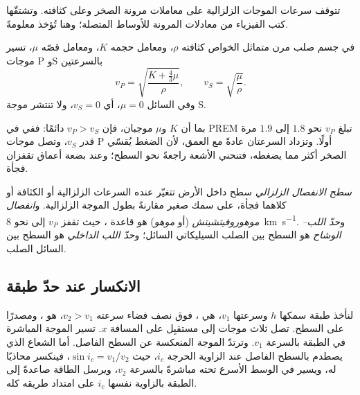 تتوقف سرعات الموجات الزلزالية على معاملات مرونة الصخر وعلى كثافته. وتشتقّها كتب الفيزياء من معادلات المرونة للأوساط المتصلة؛ وهنا تُؤخذ معلومةً.

\begin{proposition}\label{prop:b1:layered-earth:speeds}
في جسم صلب مرن متماثل الخواص كثافته $\rho$، ومعامل حجمه $K$، ومعامل قصّه $\mu$، تسير موجات P وS بالسرعتين
\[
  v_P = \sqrt{\frac{K + \tfrac43\mu}{\rho}}, \qquad v_S = \sqrt{\frac{\mu}{\rho}}.
\]
وفي السائل $\mu = 0$، أي $v_S = 0$، ولا تنتشر موجة S.
\end{proposition}
\admitted

بما أن $K$ و$\mu$ موجبان، فإن $v_P > v_S$ دائمًا: ففي   في PREM تبلغ $v_P$ نحو $1.8$ إلى $1.9$ مرة قدر $v_S$، وتصل موجات P أولًا. وتزداد السرعتان عادةً مع العمق، لأن الضغط يُقسّي الصخر أكثر مما يضغطه، فتنحني الأشعة راجعةً نحو السطح؛ وعند بضعة أعماق تقفزان فجأة.

\begin{definition}
\label{def:b1:layered-earth:discontinuity}
\emph{سطح الانفصال الزلزالي} سطح داخل الأرض تتغيّر عنده السرعات الزلزالية أو الكثافة أو كلاهما فجأة، على سمك صغير مقارنةً بطول الموجة الزلزالية. و\emph{انفصال موهوروفيتشيتش} (أو \emph{موهو}) هو قاعدة ، حيث تقفز $v_P$ إلى نحو \qty{8}{km.s^{-1}}. و\emph{حدّ اللب–الوشاح} هو السطح بين  الصلب السيليكاتي  السائل؛ و\emph{حدّ اللب الداخلي} هو السطح بين  السائل  الصلب.
\end{definition}

\subsection{الانكسار عند حدّ طبقة}

لنأخذ طبقة سمكها $h$ وسرعتها $v_1$، هي ، فوق نصف فضاء سرعته $v_2 > v_1$، هو ، ومصدرًا على السطح. تصل ثلاث موجات إلى مستقبِل على المسافة $x$. تسير الموجة المباشرة في الطبقة بالسرعة $v_1$. وترتدّ الموجة المنعكسة عن السطح الفاصل. أما الشعاع الذي يصطدم بالسطح الفاصل عند الزاوية الحرجة $i_c$، حيث $\sin i_c = v_1/v_2$، فينكسر محاذيًا له، ويسير في الوسط الأسرع تحته مباشرةً بالسرعة $v_2$، ويرسل الطاقة صاعدةً إلى الطبقة بالزاوية نفسها $i_c$ على امتداد طريقه كله.

